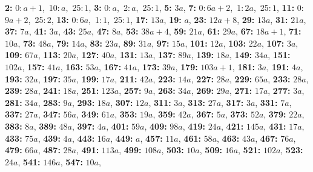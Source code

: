 \textsf{\bfseries 2:} 0:\,$a + 1$,\ 10:\,$a$,\ 25:\,$1$, \textsf{\bfseries 3:} 0:\,$a$,\ 2:\,$a$,\ 25:\,$1$, \textsf{\bfseries 5:} $3a$, \textsf{\bfseries 7:} 0:\,$6a + 2$,\ 1:\,$2a$,\ 25:\,$1$, \textsf{\bfseries 11:} 0:\,$9a + 2$,\ 25:\,$2$, \textsf{\bfseries 13:} 0:\,$6a$,\ 1:\,$1$,\ 25:\,$1$, \textsf{\bfseries 17:} $13a$, \textsf{\bfseries 19:} $a$, \textsf{\bfseries 23:} $12a + 8$, \textsf{\bfseries 29:} $13a$, \textsf{\bfseries 31:} $21a$, \textsf{\bfseries 37:} $7a$, \textsf{\bfseries 41:} $3a$, \textsf{\bfseries 43:} $25a$, \textsf{\bfseries 47:} $8a$, \textsf{\bfseries 53:} $38a + 4$, \textsf{\bfseries 59:} $21a$, \textsf{\bfseries 61:} $29a$, \textsf{\bfseries 67:} $18a + 1$, \textsf{\bfseries 71:} $10a$, \textsf{\bfseries 73:} $48a$, \textsf{\bfseries 79:} $14a$, \textsf{\bfseries 83:} $23a$, \textsf{\bfseries 89:} $31a$, \textsf{\bfseries 97:} $15a$, \textsf{\bfseries 101:} $12a$, \textsf{\bfseries 103:} $22a$, \textsf{\bfseries 107:} $3a$, \textsf{\bfseries 109:} $67a$, \textsf{\bfseries 113:} $20a$, \textsf{\bfseries 127:} $40a$, \textsf{\bfseries 131:} $13a$, \textsf{\bfseries 137:} $89a$, \textsf{\bfseries 139:} $18a$, \textsf{\bfseries 149:} $34a$, \textsf{\bfseries 151:} $102a$, \textsf{\bfseries 157:} $41a$, \textsf{\bfseries 163:} $53a$, \textsf{\bfseries 167:} $41a$, \textsf{\bfseries 173:} $39a$, \textsf{\bfseries 179:} $103a + 1$, \textsf{\bfseries 181:} $3a$, \textsf{\bfseries 191:} $4a$, \textsf{\bfseries 193:} $32a$, \textsf{\bfseries 197:} $35a$, \textsf{\bfseries 199:} $17a$, \textsf{\bfseries 211:} $42a$, \textsf{\bfseries 223:} $14a$, \textsf{\bfseries 227:} $28a$, \textsf{\bfseries 229:} $65a$, \textsf{\bfseries 233:} $28a$, \textsf{\bfseries 239:} $28a$, \textsf{\bfseries 241:} $18a$, \textsf{\bfseries 251:} $123a$, \textsf{\bfseries 257:} $9a$, \textsf{\bfseries 263:} $34a$, \textsf{\bfseries 269:} $29a$, \textsf{\bfseries 271:} $17a$, \textsf{\bfseries 277:} $3a$, \textsf{\bfseries 281:} $34a$, \textsf{\bfseries 283:} $9a$, \textsf{\bfseries 293:} $18a$, \textsf{\bfseries 307:} $12a$, \textsf{\bfseries 311:} $3a$, \textsf{\bfseries 313:} $27a$, \textsf{\bfseries 317:} $3a$, \textsf{\bfseries 331:} $7a$, \textsf{\bfseries 337:} $27a$, \textsf{\bfseries 347:} $56a$, \textsf{\bfseries 349:} $61a$, \textsf{\bfseries 353:} $19a$, \textsf{\bfseries 359:} $42a$, \textsf{\bfseries 367:} $5a$, \textsf{\bfseries 373:} $52a$, \textsf{\bfseries 379:} $22a$, \textsf{\bfseries 383:} $8a$, \textsf{\bfseries 389:} $48a$, \textsf{\bfseries 397:} $4a$, \textsf{\bfseries 401:} $59a$, \textsf{\bfseries 409:} $98a$, \textsf{\bfseries 419:} $24a$, \textsf{\bfseries 421:} $145a$, \textsf{\bfseries 431:} $17a$, \textsf{\bfseries 433:} $75a$, \textsf{\bfseries 439:} $4a$, \textsf{\bfseries 443:} $16a$, \textsf{\bfseries 449:} $a$, \textsf{\bfseries 457:} $11a$, \textsf{\bfseries 461:} $58a$, \textsf{\bfseries 463:} $43a$, \textsf{\bfseries 467:} $76a$, \textsf{\bfseries 479:} $66a$, \textsf{\bfseries 487:} $28a$, \textsf{\bfseries 491:} $113a$, \textsf{\bfseries 499:} $108a$, \textsf{\bfseries 503:} $10a$, \textsf{\bfseries 509:} $16a$, \textsf{\bfseries 521:} $102a$, \textsf{\bfseries 523:} $24a$, \textsf{\bfseries 541:} $146a$, \textsf{\bfseries 547:} $10a$, 
